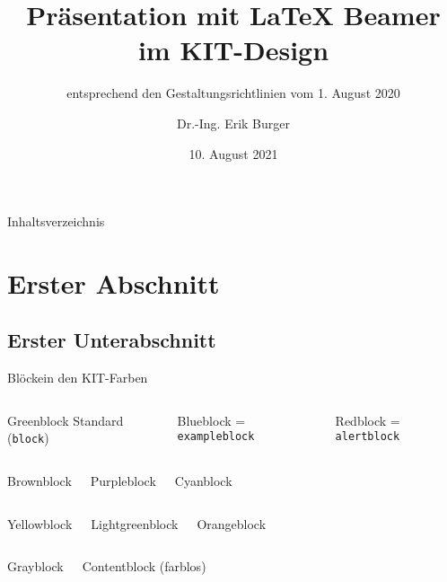 \documentclass{sdqbeamer}
\title[KIT-Beamer-Vorlage]{Präsentation mit \LaTeX{} Beamer im KIT-Design}
\subtitle{entsprechend den Gestaltungsrichtlinien vom 1. August 2020}
\author[Erik Burger]{Dr.-Ing. Erik Burger}
\date[10.\,8.\,2021]{10. August 2021}
\begin{document}
\KITtitleframe

\begin{frame}{Inhaltsverzeichnis}
\tableofcontents
\end{frame}

\section{Erster Abschnitt}

\subsection{Erster Unterabschnitt}
\begin{frame}{Blöcke}{in den KIT-Farben}
	\begin{columns}
		\begin{greenblock}{Greenblock}
			Standard (\texttt{block})
        \end{greenblock}
		\begin{blueblock}{Blueblock}
			= \texttt{exampleblock}
        \end{blueblock}
		\begin{redblock}{Redblock}
			= \texttt{alertblock}
        \end{redblock}
	\end{columns}
	\begin{columns}
		\column{.3\textwidth}
        \begin{brownblock}{Brownblock}
        \end{brownblock}
		\column{.3\textwidth}
        \begin{purpleblock}{Purpleblock}
        \end{purpleblock}
		\column{.3\textwidth}
        \begin{cyanblock}{Cyanblock}
        \end{cyanblock}
	\end{columns}
	\begin{columns}
        \begin{yellowblock}{Yellowblock}
        \end{yellowblock}
        \begin{lightgreenblock}{Lightgreenblock}
        \end{lightgreenblock}
        \begin{orangeblock}{Orangeblock}
        \end{orangeblock}
	\end{columns}
	\begin{columns}
		\column{.3\textwidth}
        \begin{grayblock}{Grayblock}
        \end{grayblock}
		\column{.3\textwidth}
		\begin{contentblock}{Contentblock}
			(farblos)
		\end{contentblock}
		\column{.3\textwidth}
	\end{columns}
\end{frame}
	  
\end{document}
